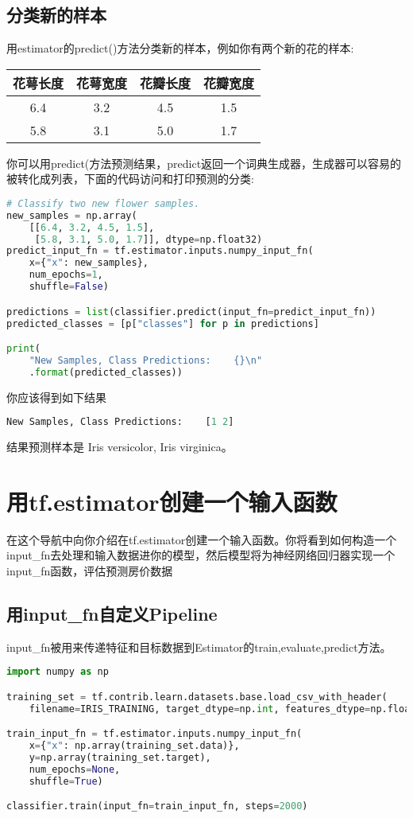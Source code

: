 \subsection{分类新的样本}
用estimator的predict()方法分类新的样本，例如你有两个新的花的样本:\par

\begin{tabular}{|c|c|c|c|}
\hline
花萼长度&花萼宽度&花瓣长度&花瓣宽度\\
\hline
6.4&3.2&4.5&1.5\\
\hline
5.8&3.1&5.0&1.7\\
\hline
\end{tabular}
\par
你可以用predict(方法预测结果，predict返回一个词典生成器，生成器可以容易的被转化成列表，下面的代码访问和打印预测的分类:
\begin{lstlisting}[language=Python]
# Classify two new flower samples.
new_samples = np.array(
    [[6.4, 3.2, 4.5, 1.5],
     [5.8, 3.1, 5.0, 1.7]], dtype=np.float32)
predict_input_fn = tf.estimator.inputs.numpy_input_fn(
    x={"x": new_samples},
    num_epochs=1,
    shuffle=False)

predictions = list(classifier.predict(input_fn=predict_input_fn))
predicted_classes = [p["classes"] for p in predictions]

print(
    "New Samples, Class Predictions:    {}\n"
    .format(predicted_classes))
\end{lstlisting}
你应该得到如下结果
\begin{lstlisting}[language=Python]
New Samples, Class Predictions:    [1 2]
\end{lstlisting}
结果预测样本是 Iris versicolor, Iris virginica。
\section{用tf.estimator创建一个输入函数}
在这个导航中向你介绍在tf.estimator创建一个输入函数。你将看到如何构造一个input\_fn去处理和输入数据进你的模型，然后模型将为神经网络回归器实现一个input\_fn函数，评估预测房价数据
\subsection{用input\_fn自定义Pipeline}
input\_fn被用来传递特征和目标数据到Estimator的train,evaluate,predict方法。
\begin{lstlisting}[language=Python]
import numpy as np

training_set = tf.contrib.learn.datasets.base.load_csv_with_header(
    filename=IRIS_TRAINING, target_dtype=np.int, features_dtype=np.float32)

train_input_fn = tf.estimator.inputs.numpy_input_fn(
    x={"x": np.array(training_set.data)},
    y=np.array(training_set.target),
    num_epochs=None,
    shuffle=True)

classifier.train(input_fn=train_input_fn, steps=2000)
\end{lstlisting}

